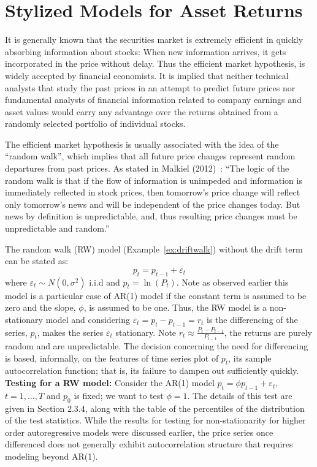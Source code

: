 \section{Stylized Models for Asset Returns}


It is generally known that the securities market is extremely efficient in quickly absorbing information about stocks: When new information arrives, it gets incorporated in the price without delay. Thus the efficient market hypothesis, is widely accepted by financial economists. It is implied that neither technical analysts that study the past prices in an attempt to predict future prices nor fundamental analysts of financial information related to company earnings and asset values would carry any advantage over the returns obtained from a randomly selected portfolio of individual stocks.


The efficient market hypothesis is usually associated with the idea of the ``random walk'', which implies that all future price changes represent random departures from past prices. As stated in Malkiel (2012)~\cite{malkiel}: ``The logic of the random walk is that if the flow of information is unimpeded and information is immediately reflected in stock prices, then tomorrow's price change will reflect only tomorrow's news and will be independent of the price changes today. But news by definition is unpredictable, and, thus resulting price changes must be unpredictable and random.''


The random walk (RW) model (Example~\ref{ex:driftwalk}) without the drift term can be stated as:
	\begin{equation}\label{eqn:2pteq}
	p_t = p_{t-1} + \varepsilon_t
	\end{equation}
where $\varepsilon_t \sim N(0,\sigma^2)$ i.i.d and $p_t = \ln{(P_t)}$. Note as observed earlier this model is a particular case of AR(1) model if the constant term is assumed to be zero and the slope, $\phi$, is assumed to be one. Thus, the RW model is a non-stationary model and considering $\varepsilon_t = p_t - p_{t-1}=r_t$ is the differencing of the series, $p_t$, makes the series $\varepsilon_t$ stationary. Note $r_t \approx \frac{P_t - P_{t-1}}{P_{t-1}}$,  the returns are purely random and are unpredictable. The decision concerning the need for differencing is based, informally, on the features of time series plot of $p_t$, its sample autocorrelation function; that is, its failure to dampen out sufficiently quickly. \\


\noindent\textbf{Testing for a RW model:} Consider the AR(1) model $p_t = \phi p_{t-1} + \varepsilon_t$, $t = 1,\ldots,T$ and $p_0$ is fixed; we want to test $\phi = 1$. The details of this test are given in Section 2.3.4, along with the table of the percentiles of the distribution of the test statistics. While the results for testing for non-stationarity for higher order autoregressive models were discussed earlier, the price series once differenced does not generally exhibit autocorrelation structure that requires modeling beyond AR(1).


